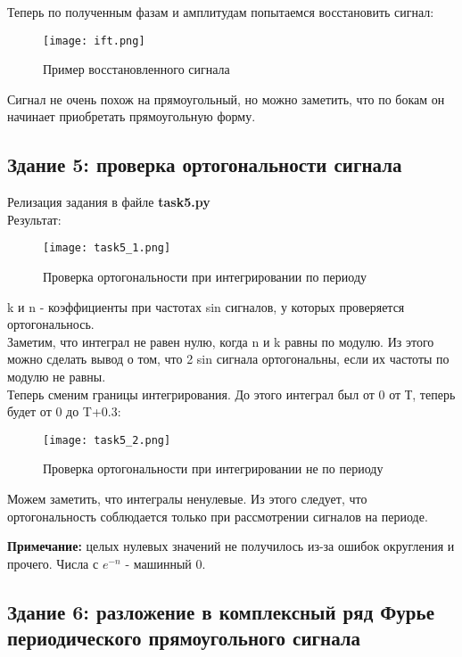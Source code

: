 Теперь по полученным фазам и амплитудам попытаемся восстановить сигнал:

\begin{figure}[H]
    \centering
    \texttt{[image: ift.png]}
    \caption{Пример восстановленного сигнала}
\end{figure}

Сигнал не очень похож на прямоугольный, но можно заметить, что по бокам он начинает приобретать прямоугольную форму.

\subsection*{\textbf{Здание 5: проверка ортогональности сигнала}}

Релизация задания в файле \textbf{task5.py} \\

Результат: \\

\begin{figure}[H]
    \centering
    \texttt{[image: task5\_1.png]}
    \caption{Проверка ортогональности при интегрировании по периоду}
\end{figure}

k и n - коэффициенты при частотах sin сигналов, у которых проверяется ортогональнось. \\

Заметим, что интеграл не равен нулю, когда n и k равны по модулю. Из этого можно сделать вывод о том, что 2 sin сигнала
ортогональны, если их частоты по модулю не равны. \\

Теперь сменим границы интегрирования. До этого интеграл был от 0 от Т, теперь будет от 0 до T+0.3:

\begin{figure}[H]
    \centering
    \texttt{[image: task5\_2.png]}
    \caption{Проверка ортогональности при интегрировании не по периоду}
\end{figure}

Можем заметить, что интегралы ненулевые. Из этого следует, что ортогональность соблюдается только при рассмотрении сигналов
на периоде.

\textbf{Примечание:} целых нулевых значений не получилось из-за ошибок округления и прочего. Числа с $e^{-n}$ - машинный 0.

\subsection*{\textbf{Здание 6: разложение в комплексный ряд Фурье периодического прямоугольного сигнала}}

